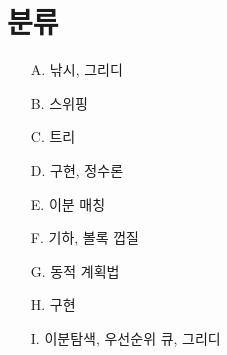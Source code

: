 \documentclass[hyperref={unicode}]{beamer}
\theoremstyle{lemstyle}
\begin{document}
    \section{분류}
    
    \begin{frame}
        \begin{enumerate}%
            \item[A.] 낚시, 그리디
            \item[B.] 스위핑
            \item[C.] 트리
            \item[D.] 구현, 정수론
            \item[E.] 이분 매칭
            \item[F.] 기하, 볼록 껍질
            \item[G.] 동적 계획법
            \item[H.] 구현
            \item[I.] 이분탐색, 우선순위 큐, 그리디
        \end{enumerate}
    \end{frame}
    
\end{document}
